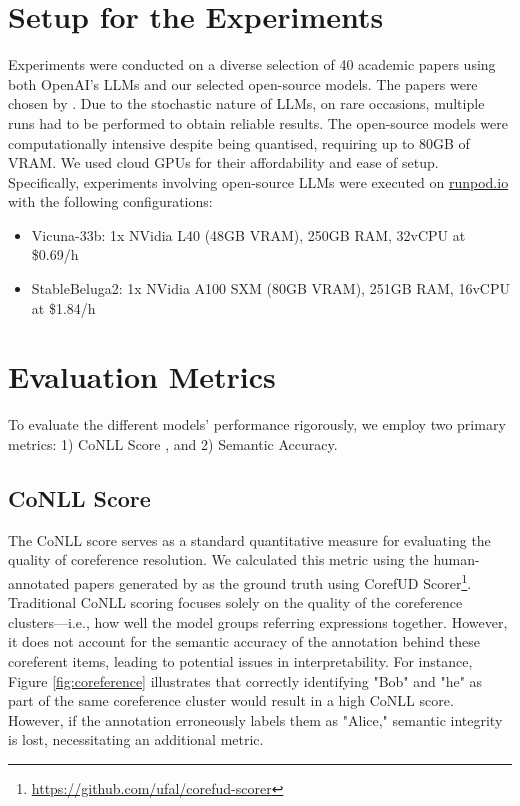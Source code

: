 \section{Setup for the Experiments}

Experiments were conducted on a diverse selection of 40 academic papers using both OpenAI's LLMs and our selected open-source models. The papers were chosen by \citet{asakura2022building}. Due to the stochastic nature of LLMs, on rare occasions, multiple runs had to be performed to obtain reliable results. The open-source models were computationally intensive despite being quantised, requiring up to 80GB of \ac{VRAM}. We used cloud \ac{GPU}s for their affordability and ease of setup. Specifically, experiments involving open-source LLMs were executed on \href{https://runpod.io}{runpod.io} with the following configurations:

\begin{itemize}
    \item Vicuna-33b: 1x NVidia L40 (48GB VRAM), 250GB RAM, 32vCPU at \$0.69/h
    \item StableBeluga2: 1x NVidia A100 SXM (80GB VRAM), 251GB RAM, 16vCPU at \$1.84/h
\end{itemize}

\section{Evaluation Metrics}

To evaluate the different models' performance rigorously, we employ two primary metrics: 1) CoNLL Score \citep{pradhan2012conll}, and 2) Semantic Accuracy.

\subsection{CoNLL Score}
The CoNLL score serves as a standard quantitative measure for evaluating the quality of coreference resolution. We calculated this metric using the human-annotated papers generated by \citet{asakura2022building} as the ground truth using CorefUD Scorer\footnote{\url{https://github.com/ufal/corefud-scorer}}. Traditional CoNLL scoring focuses solely on the quality of the coreference clusters—i.e., how well the model groups referring expressions together. However, it does not account for the semantic accuracy of the annotation behind these coreferent items, leading to potential issues in interpretability. For instance, Figure \ref{fig:coreference} illustrates that correctly identifying "Bob" and "he" as part of the same coreference cluster would result in a high CoNLL score. However, if the annotation erroneously labels them as "Alice," semantic integrity is lost, necessitating an additional metric.

